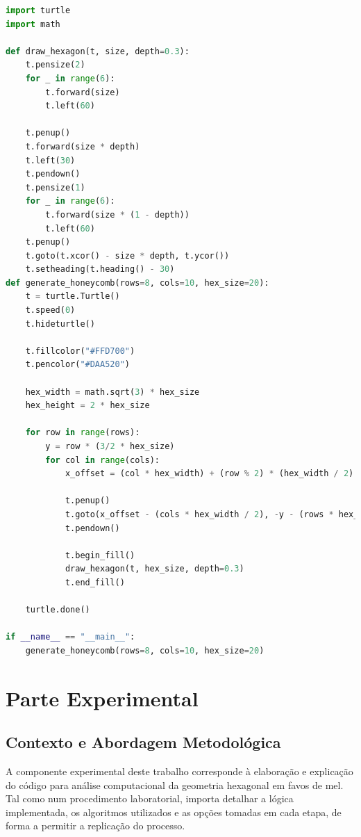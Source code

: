 \documentclass[12pt,a4paper,oneside]{extarticle}
\begin{document}
\begin{lstlisting}[language=python]
import turtle
import math

def draw_hexagon(t, size, depth=0.3):
    t.pensize(2)
    for _ in range(6):
        t.forward(size)
        t.left(60)
    
    t.penup()
    t.forward(size * depth)
    t.left(30)
    t.pendown()
    t.pensize(1)
    for _ in range(6):
        t.forward(size * (1 - depth))
        t.left(60)
    t.penup()
    t.goto(t.xcor() - size * depth, t.ycor())
    t.setheading(t.heading() - 30)
def generate_honeycomb(rows=8, cols=10, hex_size=20):
    t = turtle.Turtle()
    t.speed(0)
    t.hideturtle()
    
    t.fillcolor("#FFD700")
    t.pencolor("#DAA520")
    
    hex_width = math.sqrt(3) * hex_size
    hex_height = 2 * hex_size
    
    for row in range(rows):
        y = row * (3/2 * hex_size)
        for col in range(cols):
            x_offset = (col * hex_width) + (row % 2) * (hex_width / 2)
            
            t.penup()
            t.goto(x_offset - (cols * hex_width / 2), -y - (rows * hex_height / 4))
            t.pendown()
        
            t.begin_fill()
            draw_hexagon(t, hex_size, depth=0.3)
            t.end_fill()
    
    turtle.done()

if __name__ == "__main__":
    generate_honeycomb(rows=8, cols=10, hex_size=20)
\end{lstlisting}

\section{Parte Experimental}

\subsection{Contexto e Abordagem Metodológica}

A componente experimental deste trabalho corresponde à elaboração e explicação do código para análise computacional da geometria hexagonal em favos de mel. Tal como num procedimento laboratorial, importa detalhar a lógica implementada, os algoritmos utilizados e as opções tomadas em cada etapa, de forma a permitir a replicação do processo.
\end{document}
